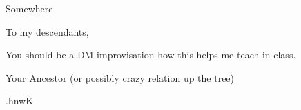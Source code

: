 \documentclass[]{letter}
\begin{document}

\begin{letter}{Somewhere }
\address{Rosen Manor}

\opening{To my descendants,}

You should be a DM
improvisation
how this helps me teach in class.


\signature{Professor Andrew Benjamin Rosen}

\closing{Your Ancestor (or possibly crazy relation up the tree) }



\begin{cjhebrew}
	.hnwK
\end{cjhebrew}
\end{letter}
\end{document}
